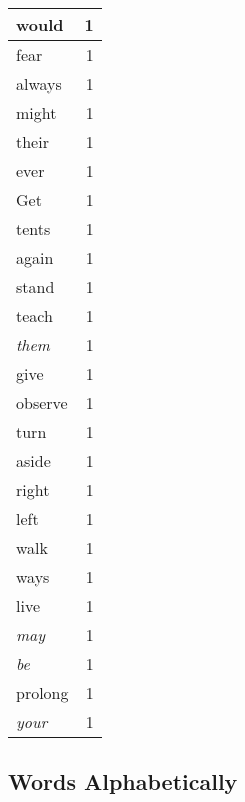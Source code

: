 \begin{center}
\begin{longtable}{l|r}
would & 1 \\ \hline
fear & 1 \\ \hline
always & 1 \\ \hline
might & 1 \\ \hline
their & 1 \\ \hline
ever & 1 \\ \hline
Get & 1 \\ \hline
tents & 1 \\ \hline
again & 1 \\ \hline
stand & 1 \\ \hline
teach & 1 \\ \hline
\emph{them} & 1 \\ \hline
give & 1 \\ \hline
observe & 1 \\ \hline
turn & 1 \\ \hline
aside & 1 \\ \hline
right & 1 \\ \hline
left & 1 \\ \hline
walk & 1 \\ \hline
ways & 1 \\ \hline
live & 1 \\ \hline
\emph{may} & 1 \\ \hline
\emph{be} & 1 \\ \hline
prolong & 1 \\ \hline
\emph{your} & 1 \\ \hline
\end{longtable}
\end{center}



\normalsize



\subsection{Words Alphabetically}

